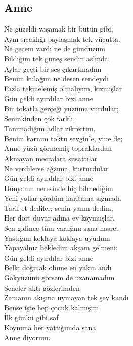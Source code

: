 \subsection{Anne}

Ne güzeldi yaşamak bir bütün gibi, \\
Aynı sıcaklığı paylaşmak tek vücutta. \\
Ne gecem vardı ne de gündüzüm \\
Bildiğim tek güneş sendin aslında. \\
Aylar geçti bir ses çıkartmadım \\
Benim kulağım ne desen sendeydi \\
Fazla tekmelemiş olmalıyım, kızmışlar \\
Gün geldi ayırdılar bizi anne \\

\noindent\newline
Bir tokatla gerçeği yüzüme vurdular; \\
Seninkinden çok farklı, \\
Tanımadığım adlar zikrettim. \\
Benim karnım toktu sevginle, yine de; \\
Anne yüzü görmemiş topraklardan \\
Akmayan mecralara susattılar \\
Ne verdilerse ağzıma, kusturdular \\
Gün geldi ayırdılar bizi anne \\

\noindent\newline
Dünyanın neresinde hiç bilmediğim \\
Yeni yollar gördüm haritama sığmadı. \\
Tarif et dediler; senin yanın dedim, \\
Her dört duvar adına ev koymuşlar. \\
Sen gidince tüm varlığım sana hasret \\
Yastığını koklaya koklaya uyudum \\
Yapayalnız bekledim akşam gelmeni; \\
Gün geldi ayırdılar bizi anne \\

\noindent\newline
Belki doğmak ölüme en yakın andı \\
Gökyüzünü görsem de uzanamadım \\
Seneler aktı gözlerimden \\
Zamanın akışına uymayan tek şey kandı \\
Bense işte hep çocuk kalmışım \\
İlk günkü gibi saf \\
Koynuna her yattığımda sana \\
Anne diyorum. \\